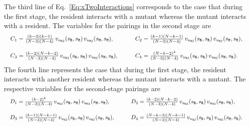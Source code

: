 \documentclass[11pt]{article}
\def\resident{\texttt{R}}
\def\mutant{\texttt{M}}
\def\strategy{s}
\theoremstyle{plainCl1}
\theoremstyle{plainCl2}
\begin{document}
 The third line of Eq.~\eqref{Eq:xTwoInteractions} corresponds to the case that during the first stage, the resident interacts with a mutant whereas the mutant interacts with a resident. The variables for the pairings in the second stage are
\begin{equation*}
  \setlength{\arraycolsep}{10pt}
  \begin{array}{llrl}
   C_1  = \frac{\left(k - 3\right) \left(k - 1\right)}{(N - 3) (N - 4)} \, v_{u_{\resident 2}}(\strategy_\resident,\strategy_\mutant) \, v_{u_{\mutant 2}}(\strategy_\mutant,\strategy_\mutant) , \quad
   &C_2 = \frac{\left(k - 1\right) \left(N - k - 1\right)}{(N - 3) (N - 4)} \, v_{u_{\resident 2}}(\strategy_\resident,\strategy_\resident) \, v_{u_{\mutant 2}}(\strategy_\mutant,\strategy_\mutant) , \\[0.5cm] 
   C_3  = \frac{\left(k - 2\right) \left(N - k - 2\right)}{(N - 3) (N - 4)} \, v_{u_{\resident 2}}(\strategy_\resident,\strategy_\mutant) \, v_{u_{\mutant 2}}(\strategy_\mutant,\strategy_\resident) , \quad
   &C_4 = \frac{\left(N - k - 2\right)^{2}}{(N - 3) (N - 4)} \, v_{u_{\resident 2}}(\strategy_\resident,\strategy_\resident) \, v_{u_{\mutant 2}}(\strategy_\mutant,\strategy_\resident) .
   \end{array}
   \end{equation*}
The fourth line represents the case that during the first stage, the resident interacts with another resident whereas the mutant interacts with a mutant. The respective variables for the second-stage pairings are
\begin{equation*}
  \setlength{\arraycolsep}{10pt}
  \begin{array}{llrl}
   D_1  = \frac{\left(k - 2\right)^{2}}{(N - 3) (N - 4)} \, v_{u_{\resident 2}}(\strategy_\resident,\strategy_\mutant)\, v_{u_{\mutant 2}}(\strategy_\mutant,\strategy_\mutant) , \quad
   &D_2 = \frac{\left(k - 2\right) \left(N - k - 2\right)}{(N - 3) (N - 4)}\,  v_{u_{\resident 2}}(\strategy_\resident,\strategy_\resident)\, v_{u_{\mutant 2}}(\strategy_\mutant,\strategy_\mutant) , \\[0.5cm] 
   D_3  = \frac{\left(k - 1\right) \left(N - k - 1\right)}{(N - 3) (N - 4)} \, v_{u_{\resident 2}}(\strategy_\resident,\strategy_\mutant) \,v_{u_{\mutant 2}}(\strategy_\mutant,\strategy_\resident) , \quad
   &D_4 = \frac{\left(N - k - 3\right) \left(N - k - 1\right)}{(N - 3) (N - 4)} \, v_{u_{\resident 2}}(\strategy_\resident,\strategy_\resident) \,v_{u_{\mutant 2}}(\strategy_\mutant,\strategy_\resident) .
      \end{array}
   \end{equation*}
\end{document}
